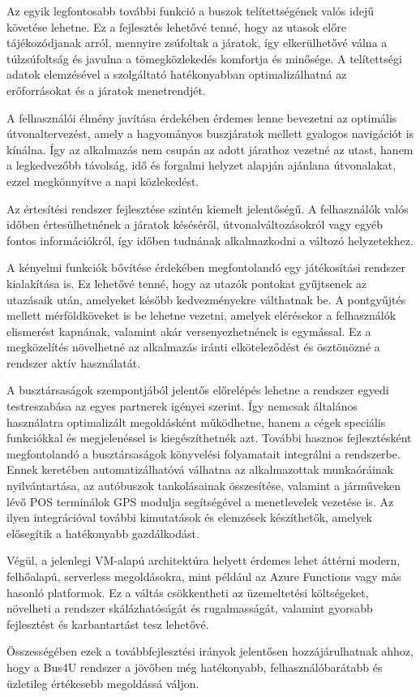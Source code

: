 Az egyik legfontosabb további funkció a buszok telítettségének valós idejű követése lehetne. Ez a fejlesztés lehetővé tenné, hogy az utasok előre tájékozódjanak arról, mennyire zsúfoltak a járatok, így elkerülhetővé válna a túlzsúfoltság és javulna a tömegközlekedés komfortja és minősége. A telítettségi adatok elemzésével a szolgáltató hatékonyabban optimalizálhatná az erőforrásokat és a járatok menetrendjét.

A felhasználói élmény javítása érdekében érdemes lenne bevezetni az optimális útvonaltervezést, amely a hagyományos buszjáratok mellett gyalogos navigációt is kínálna. Így az alkalmazás nem csupán az adott járathoz vezetné az utast, hanem a legkedvezőbb távolság, idő és forgalmi helyzet alapján ajánlana útvonalakat, ezzel megkönnyítve a napi közlekedést.

Az értesítési rendszer fejlesztése szintén kiemelt jelentőségű. A felhasználók valós időben értesülhetnének a járatok késéséről, útvonalváltozásokról vagy egyéb fontos információkról, így időben tudnának alkalmazkodni a változó helyzetekhez.

A kényelmi funkciók bővítése érdekében megfontolandó egy játékosítási rendszer kialakítása is. Ez lehetővé tenné, hogy az utazók pontokat gyűjtsenek az utazásaik után, amelyeket később kedvezményekre válthatnak be. A pontgyűjtés mellett mérföldköveket is be lehetne vezetni, amelyek elérésekor a felhasználók elismerést kapnának, valamint akár versenyezhetnének is egymással. Ez a megközelítés növelhetné az alkalmazás iránti elköteleződést és ösztönözné a rendszer aktív használatát.

A busztársaságok szempontjából jelentős előrelépés lehetne a rendszer egyedi testreszabása az egyes partnerek igényei szerint. Így nemcsak általános használatra optimalizált megoldásként működhetne, hanem a cégek speciális funkciókkal és megjelenéssel is kiegészíthetnék azt. További hasznos fejlesztésként megfontolandó a busztársaságok könyvelési folyamatait integrálni a rendszerbe. Ennek keretében automatizálhatóvá válhatna az alkalmazottak munkaóráinak nyilvántartása, az autóbuszok tankolásainak összesítése, valamint a járműveken lévő POS terminálok GPS modulja segítségével a menetlevelek vezetése is. Az ilyen integrációval további kimutatások és elemzések készíthetők, amelyek elősegítik a hatékonyabb gazdálkodást.

Végül, a jelenlegi VM-alapú architektúra helyett érdemes lehet áttérni modern, felhőalapú, serverless megoldásokra, mint például az Azure Functions vagy más hasonló platformok. Ez a váltás csökkentheti az üzemeltetési költségeket, növelheti a rendszer skálázhatóságát és rugalmasságát, valamint gyorsabb fejlesztést és karbantartást tesz lehetővé.

Összességében ezek a továbbfejlesztési irányok jelentősen hozzájárulhatnak ahhoz, hogy a Bus4U rendszer a jövőben még hatékonyabb, felhasználóbarátabb és üzletileg értékesebb megoldássá váljon.


